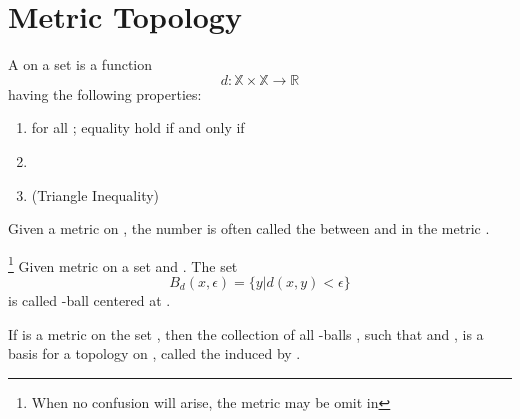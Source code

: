 \section{Metric Topology}

\begin{definition}[metric]\label{def:Metric}
      A  on a set  is a function
      \begin{equation*}
            d: \mathbb{X} \times \mathbb{X} \rightarrow \mathbb{R}
      \end{equation*}
      having the following properties:
      \begin{enumerate}
            \item {} for all ; equality hold if and only if 

            \item {}

            \item (Triangle Inequality) 
      \end{enumerate}

      Given a metric  on , the number  is often called the \label{def:Distance} between  and  in the metric .
\end{definition}

\begin{definition}\label{def:EpsilonBallCenteredAtX}\footnote{
      When no confusion will arise, the metric  may be omit in 
}
      Given metric  on a set  and . The set
      \begin{equation*}
            B_{d}(x,\epsilon) = \{
                  y | d(x,y) < \epsilon
            \}
      \end{equation*}
      is called \mt{\epsilon}-ball centered at .
\end{definition}

\begin{definition}\label{def:MetricTopology}
      If  is a metric on the set , then the collection of all \mt{\epsilon}-balls , such that  and , is a basis for a topology on , called the  induced by .
\end{definition}

